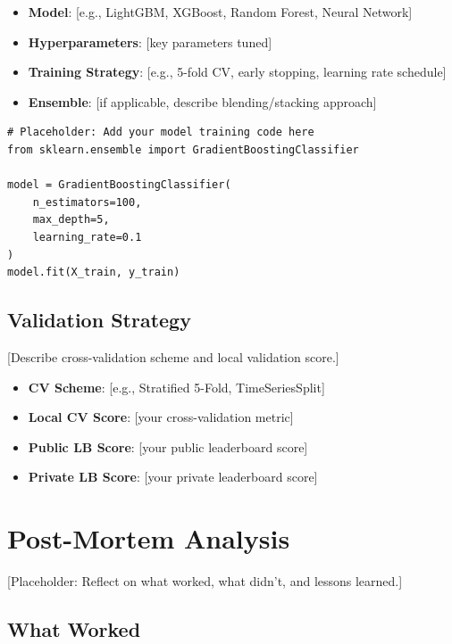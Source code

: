 \documentclass{article}
\begin{document}
\begin{itemize}
    \item \textbf{Model}: [e.g., LightGBM, XGBoost, Random Forest, Neural Network]
    \item \textbf{Hyperparameters}: [key parameters tuned]
    \item \textbf{Training Strategy}: [e.g., 5-fold CV, early stopping, learning rate schedule]
    \item \textbf{Ensemble}: [if applicable, describe blending/stacking approach]
\end{itemize}

\begin{lstlisting}[caption=Model training snippet]
# Placeholder: Add your model training code here
from sklearn.ensemble import GradientBoostingClassifier

model = GradientBoostingClassifier(
    n_estimators=100,
    max_depth=5,
    learning_rate=0.1
)
model.fit(X_train, y_train)
\end{lstlisting}

\subsection{Validation Strategy}

[Describe cross-validation scheme and local validation score.]

\begin{itemize}
    \item \textbf{CV Scheme}: [e.g., Stratified 5-Fold, TimeSeriesSplit]
    \item \textbf{Local CV Score}: [your cross-validation metric]
    \item \textbf{Public LB Score}: [your public leaderboard score]
    \item \textbf{Private LB Score}: [your private leaderboard score]
\end{itemize}

\section{Post-Mortem Analysis}

 [Placeholder: Reflect on what worked, what didn't, and lessons learned.]

\subsection{What Worked}
\end{document}
